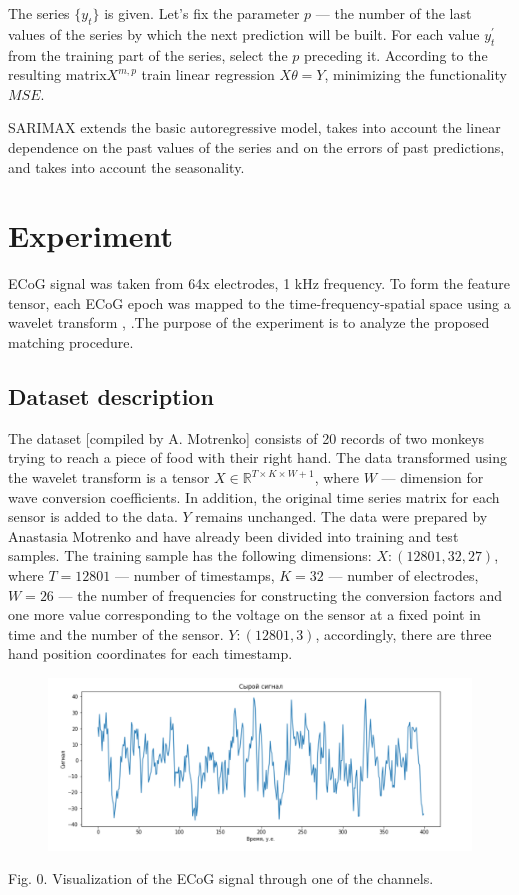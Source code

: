 \documentclass{article}
\begin{document}
The series $\{y_t\}$ is given. Let's fix the parameter $p$ --- the number of the last values of the series by which the next prediction will be built. For each value $y_t^{'}$ from the training part of the series, select the $ p $ preceding it. According to the resulting matrix$X^{m, p}$ train linear regression $X\theta = Y$, minimizing the functionality $MSE$.

\par
SARIMAX  \cite{7514029} extends the basic autoregressive model, takes into account the linear dependence on the past values of the series and on the errors of past predictions, and takes into account the seasonality.
 

\section{Experiment}
ECoG signal was taken from 64x electrodes, 1 kHz frequency. To form the feature tensor, each ECoG epoch was mapped to the time-frequency-spatial space using a wavelet transform  \cite{eliseyev2016penalized}, \cite{chao2010long}.The purpose of the experiment is to analyze the proposed matching procedure.
\subsection{Dataset description}
The dataset [compiled by A. Motrenko] consists of 20 records of two monkeys trying to reach a piece of food with their right hand. The data transformed using the wavelet transform is a tensor $X \in \mathds{R}^{T \times K \times W+1}$, where $W$ --- dimension for wave conversion coefficients. In addition, the original time series matrix for each sensor is added to the data. $Y$ remains unchanged. The data were prepared by Anastasia Motrenko and have already been divided into training and test samples. The training sample has the following dimensions:  $X:(12801, 32, 27)$, where $T = 12801$ --- number of timestamps, $K = 32$ --- number of electrodes, $W = 26$ --- the number of frequencies for constructing the conversion factors and one more value corresponding to the voltage on the sensor at a fixed point in time and the number of the sensor. $Y:(12801, 3)$, accordingly, there are three hand position coordinates for each timestamp.
\begin{figure}[H]
\includegraphics[scale=0.5]{images/8.png}
\end{figure}
Fig. 0. Visualization of the ECoG signal through one of the channels.
\end{document}
